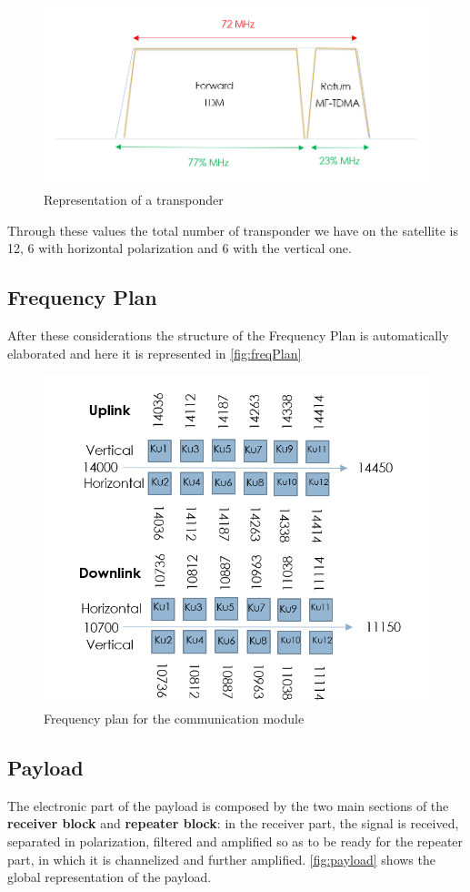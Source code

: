 \documentclass[11pt,a4paper,titlepage]{article}
\begin{document}
		\begin{figure}
		\centering
		\includegraphics[width = .8\textwidth]{Transponder.png}
		\caption{Representation of a transponder}
		\label{fig:transp}
		\end{figure}

		Through these values the total number of transponder we have on the satellite is 12, 6 with horizontal polarization and 6 with the vertical one.

	\subsection{Frequency Plan}
After these considerations the structure of the Frequency Plan is automatically elaborated and here it is represented in \autoref{fig:freqPlan}

		\begin{figure}
		\centering
		\includegraphics[width = .65\textwidth]{Frequencies.png}
		\caption{Frequency plan for the communication module}
		\label{fig:freqPlan}
		\end{figure}

	\subsection{Payload}
		The electronic part of the payload is composed by the two main sections of the \textbf{receiver block} and \textbf{repeater block}: in the receiver part, the signal is received, separated in polarization, filtered and amplified so as to be ready for the repeater part, in which it is channelized and further amplified. \autoref{fig:payload} shows the global representation of the payload.
\end{document}
